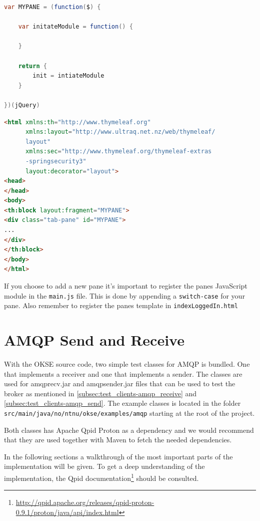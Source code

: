 \begin{lstlisting}[language=Java, captionpos=b, caption=Skeleton for a JavaScript module, frame=bt, showstringspaces=false]
var MYPANE = (function($) { 

    var initateModule = function() {
    
    }

    return {
        init = intiateModule
    }

})(jQuery)
\end{lstlisting}

\begin{lstlisting}[language=HTML, captionpos=b, caption=Skeleton for a Thymeleaf-template, frame=bt, showstringspaces=false]
<html xmlns:th="http://www.thymeleaf.org"
      xmlns:layout="http://www.ultraq.net.nz/web/thymeleaf/
      layout"
      xmlns:sec="http://www.thymeleaf.org/thymeleaf-extras
      -springsecurity3"
      layout:decorator="layout">
<head>
</head>
<body>
<th:block layout:fragment="MYPANE">
<div class="tab-pane" id="MYPANE">
...
</div>
</th:block>
</body>
</html>
\end{lstlisting}

If you choose to add a new pane it's important to register the panes JavaScript module in the \verb!main.js! file. This is done by appending a \verb!switch-case! for your pane. Also remember to register the panes template in \verb!indexLoggedIn.html!

\section{AMQP Send and Receive}
With the OKSE source code, two simple test classes for AMQP is bundled. One that implements a receiver and one that implements a sender. The classes are used for amqprecv.jar and amqpsender.jar files that can be used to test the broker as mentioned in \ref{subsec:test_clients-amqp_receive} and \ref{subsec:test_clients-amqp_send}. The example classes is located in the folder \verb!src/main/java/no/ntnu/okse/examples/amqp! starting at the root of the project.

Both classes has Apache Qpid Proton as a dependency and we would recommend that they are used together with Maven to fetch the needed dependencies.

In the following sections a walkthrough of the most important parts of the implementation will be given. To get a deep understanding of the implementation, the Qpid documentation\footnote{\url{http://qpid.apache.org/releases/qpid-proton-0.9.1/proton/java/api/index.html}} should be consulted.

